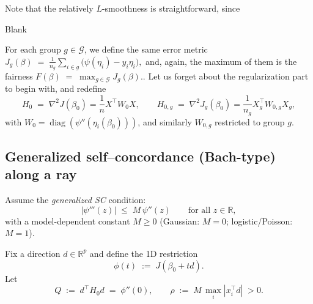 \documentclass[11pt]{article}
\theoremstyle{plain}
\theoremstyle{definition}
\newcommand{\1}{\mathbf{1}}
\newcommand{\G}{\mathcal{G}}
\renewcommand{\t}{^{\top}}
\begin{document}
Note that the relatively $L$-smoothness is straightforward, since 



\newpage
Blank
\newpage 

 For each group $g\in \G$, we define the same error metric
$
J_g(\beta)\;=\;\frac{1}{n_g}\sum_{i\in g} \big(\psi(\eta_i)-y_i\eta_i\big),
$
and, again, the maximum of them is the fairness $
F(\beta)\;=\;\max_{g\in\mathcal{G}} J_g(\beta).
$. Let us forget about the regularization part to begin with, and redefine
\[
H_0\;=\;\nabla^2 J(\beta_0)=\frac{1}{n}X^\top W_0 X,\qquad
H_{0,g}\;=\;\nabla^2 J_g(\beta_0)=\frac{1}{n_g}X_g^\top W_{0,g} X_g,
\]
with $W_0=\operatorname{diag}(\psi''(\eta_i(\beta_0)))$, and similarly $W_{0,g}$ restricted to group $g$.

\subsection{Generalized self–concordance (Bach-type) along a ray}
Assume the \emph{generalized SC} condition:
\begin{equation}
\label{eq:gsc}
|\psi'''(z)| \;\le\; M\,\psi''(z)\qquad\text{for all }z\in\mathbb{R},
\end{equation}
with a model-dependent constant $M\ge 0$ (Gaussian: $M=0$; logistic/Poisson: $M=1$).

Fix a direction $d\in\mathbb{R}^p$ and define the 1D restriction
\[
\phi(t)\;:=\;J(\beta_0+t d).
\]
Let
\[
Q\;:=\;d^\top H_0 d\;=\;\phi''(0),\qquad
\rho\;:=\;M\,\max_{i}|x_i^\top d|\;>0.
\]
\end{document}
